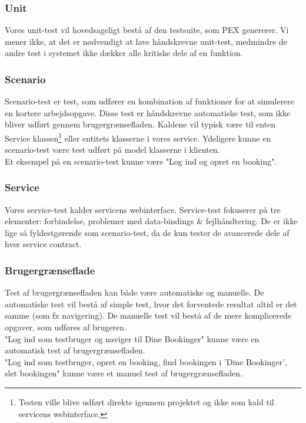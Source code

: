 \subsubsection{Unit}
\label{Test_intendedStrat_types_unit}
Vores unit-test vil hovedsageligt bestå af den testsuite, som PEX genererer. Vi mener ikke, at det er nødvendigt at lave håndskrevne unit-test, medmindre de andre test i systemet ikke dækker alle kritiske dele af en funktion.

\subsubsection{Scenario}
\label{Test_intendedStrat_types_sce}
Scenario-test er test, som udfører en kombination af funktioner for at simulerere en kortere arbejdsopgave. Disse test er håndskrevne automatiske test, som ikke bliver udført gennem brugergrænsefladen. Kaldene vil typisk være til enten Service klassen\footnote{Testen ville blive udført direkte igennem projektet og ikke som kald til servicens webinterface.} eller entitets klasserne i vores service. Ydeligere kunne en scenario-test være test udført på model klasserne i klienten. 
\\Et eksempel på en scenario-test kunne være "Log ind og opret en booking".

\subsubsection{Service}
\label{Test_intendedStrat_types_service}
Vores service-test kalder servicens webinterface. Service-test fokuserer på tre elementer: forbindelse, problemer med data-bindings \& fejlhåndtering. De er ikke lige så fyldestgørende som scenario-test, da de kun tester de avancerede dele af hver service contract.

\subsubsection{Brugergrænseflade}
\label{Test_intendedStrat_types_UI}
Test af brugergrænsefladen kan både være automatiske og manuelle. De automatiske test vil bestå af simple test, hvor det forventede resultat altid er det samme (som fx navigering). De manuelle test vil bestå af de mere komplicerede opgaver, som udføres af brugeren.
\\"Log ind som testbruger og naviger til Dine Bookinger" kunne være en automatisk test af brugergrænsefladen.
\\"Log ind som testbruger, opret en booking, find bookingen i 'Dine Bookinger', slet bookingen" kunne være et manuel test af brugergrænsefladen.

